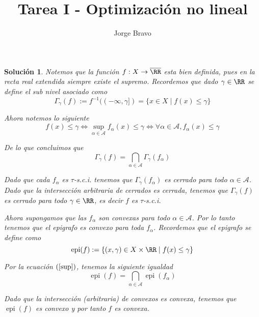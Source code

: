 \documentclass[a4paper,oneside,10.5pt]{USMArt}
\title{Tarea I - Optimización no lineal}
\author{Jorge Bravo}
\DeclareMathOperator{\epi}{epi}
\newtheorem{sol}{Soluci\'on}
\begin{document}
\maketitle

\begin{sol}
  Notemos que la función $f : X \to \overline{\RR}$ esta bien definida, pues en la recta real extendida siempre existe
  el supremo. Recordemos que dado $\gamma \in \RR$ se define el sub nivel asociado como
  \begin{equation*}
    \Gamma_{\gamma}(f) := f^{-1}((-\infty, \gamma]) = \{ x \in X \; | \; f(x) \leq \gamma\}
  \end{equation*}

  Ahora notemos lo siguiente
  \begin{equation}
    \label{sup}
    f(x) \leq \gamma \iff \sup_{\alpha \in \mathcal{A}} f_{\alpha}(x) \leq \gamma \iff \forall \alpha \in \mathcal{A}, f_{\alpha}(x) \leq \gamma
  \end{equation}

  De lo que concluimos que
  \begin{equation*}
    \Gamma_{\gamma}(f) = \bigcap_{\alpha \in \mathcal{A}} \Gamma_{\gamma}(f_{\alpha})
  \end{equation*}

  Dado que cada $f_{\alpha}$ es $\tau$-s.c.i.  tenemos que $\Gamma_{\gamma}(f_{\alpha})$ es cerrado para todo $\alpha \in \mathcal{A}$. Dado que la intersección arbitraria de cerrados es cerrada, tenemos que $\Gamma_{\gamma}(f)$ es cerrado
  para todo $\gamma \in \RR$, es decir $f$ es $\tau$-s.c.i.

  Ahora supongamos que las $f_{\alpha}$ son convexas para todo $\alpha \in \mathcal{A}$. Por lo tanto tenemos que el epigrafo es convexo para toda $f_{\alpha}$. Recordemos que el epigrafo se define como
  \begin{equation*}
    \epi(f) := \{ (x, \gamma) \in X \times \RR \; | \; f(x) \leq \gamma\}
  \end{equation*}

  Por la ecuación $(\ref{sup})$, tenemos la siguiente igualdad
  \begin{equation*}
    \epi(f) = \bigcap_{\alpha \in \mathcal{A}} \epi(f_{\alpha})
  \end{equation*}

  Dado que la intersección (arbitraria) de convexos es convexa, tenemos que $\epi(f)$ es convexo y por tanto $f$ es convexa.
\end{sol}
\end{document}
